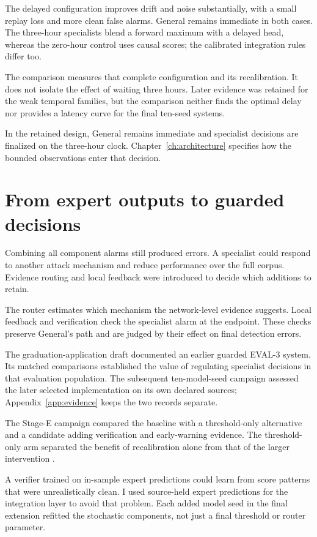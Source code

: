 The delayed configuration improves drift and noise substantially, with a small replay loss and more clean false alarms. General remains immediate in both cases. The three-hour specialists blend a forward maximum with a delayed head, whereas the zero-hour control uses causal scores; the calibrated integration rules differ too.

The comparison measures that complete configuration and its recalibration. It does not isolate the effect of waiting three hours. Later evidence was retained for the weak temporal families, but the comparison neither finds the optimal delay nor provides a latency curve for the final ten-seed systems.

In the retained design, General remains immediate and specialist decisions are finalized on the three-hour clock. Chapter~\ref{ch:architecture} specifies how the bounded observations enter that decision.

\section{From expert outputs to guarded decisions}
Combining all component alarms still produced errors. A specialist could respond to another attack mechanism and reduce performance over the full corpus. Evidence routing and local feedback were introduced to decide which additions to retain.

The router estimates which mechanism the network-level evidence suggests. Local feedback and verification check the specialist alarm at the endpoint. These checks preserve General's path and are judged by their effect on final detection errors.

The graduation-application draft documented an earlier guarded EVAL-3 system. Its matched comparisons established the value of regulating specialist decisions in that evaluation population. The subsequent ten-model-seed campaign assessed the later selected implementation on its own declared sources; Appendix~\ref{app:evidence} keeps the two records separate.

The Stage-E campaign compared the baseline with a threshold-only alternative and a candidate adding verification and early-warning evidence. The threshold-only arm separated the benefit of recalibration alone from that of the larger intervention \cite{projectcampaign}.

A verifier trained on in-sample expert predictions could learn from score patterns that were unrealistically clean. I used source-held expert predictions for the integration layer to avoid that problem. Each added model seed in the final extension refitted the stochastic components, not just a final threshold or router parameter.

